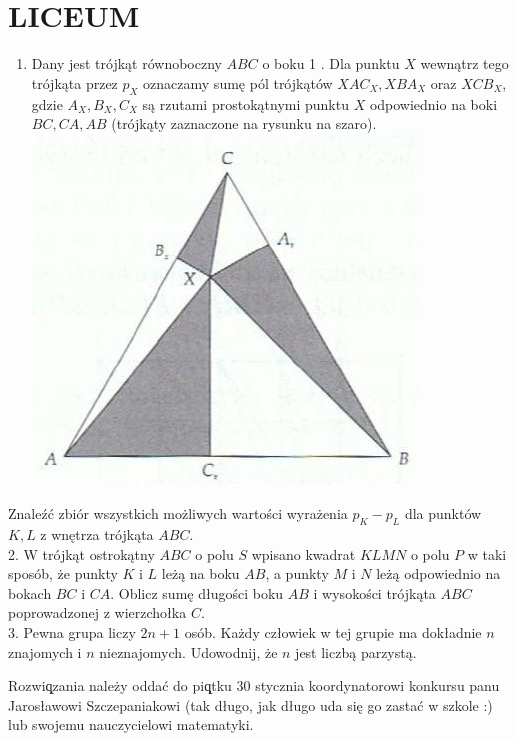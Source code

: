 \documentclass[10pt]{article}
\begin{document}
\section*{LICEUM}
\begin{enumerate}
  \item Dany jest trójkąt równoboczny \(A B C\) o boku 1 . Dla punktu \(X\) wewnątrz tego trójkąta przez \(p_{X}\) oznaczamy sumę pól trójkątów \(X A C_{X}, X B A_{X}\) oraz \(X C B_{X}\), gdzie \(A_{X}, B_{X}, C_{X}\) są rzutami prostokątnymi punktu \(X\) odpowiednio na boki \(B C, C A, A B\) (trójkąty zaznaczone na rysunku na szaro).\\
\includegraphics[max width=\textwidth, center]{2024_11_21_707bbc5bde3efcc74a79g-1}
\end{enumerate}

Znaleźć zbiór wszystkich możliwych wartości wyrażenia \(p_{K}-p_{L}\) dla punktów \(K, L\) z wnętrza trójkąta \(A B C\).\\
2. W trójkąt ostrokątny \(A B C\) o polu \(S\) wpisano kwadrat \(K L M N\) o polu \(P\) w taki sposób, że punkty \(K\) i \(L\) leżą na boku \(A B\), a punkty \(M\) i \(N\) leżą odpowiednio na bokach \(B C\) i \(C A\). Oblicz sumę długości boku \(A B\) i wysokości trójkąta \(A B C\) poprowadzonej z wierzchołka \(C\).\\
3. Pewna grupa liczy \(2 n+1\) osób. Każdy człowiek w tej grupie ma dokładnie \(n\) znajomych i \(n\) nieznajomych. Udowodnij, że \(n\) jest liczbą parzystą.

Rozwiq̨zania należy oddać do piq̨tku 30 stycznia koordynatorowi konkursu panu Jarosławowi Szczepaniakowi (tak długo, jak długo uda się go zastać w szkole :) lub swojemu nauczycielowi matematyki.
\end{document}

